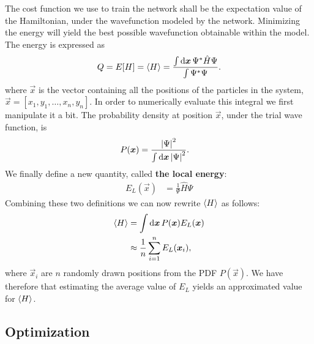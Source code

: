 \documentclass[a4paper, 11pt]{article}
\begin{document}
\begin{multicols}{2}
    The cost function we use to train the network shall be the expectation value
    of the Hamiltonian, under the wavefunction modeled by the network.
    Minimizing the energy will yield the best possible wavefunction obtainable
    within the model. The energy is expressed as
    \begin{align}
        Q = E[H] = \expval{H} = \frac{\int \dd{\bm x} \Psi^* \hat H \Psi}{\int
        \Psi^*\Psi}.
    \end{align}
    where $\vec x$ is the vector containing all the positions of the particles in
    the system, $\vec x = [x_1, y_1,\dots, x_n, y_n]$.
    In order to numerically evaluate this integral we first manipulate it a bit.
    The probability density at position $\vec x$, under the trial wave function, is
    \begin{align}
        P(\bm x) &= \frac{\abs{\Psi}^2}{\int \dd{\bm x}\abs{\Psi}^2}.
    \end{align}
    We finally define a new quantity, called \textbf{the local energy}:
    \begin{align}
        E_L(\vec x) &= \frac{1}{\Psi}\hat H\Psi\label{eq:E_L}
    \end{align}
    Combining these two definitions we can now rewrite $\expval{H}$ as follows:
    \begin{align}
        \begin{split}
            \expval{H} &= \int \dd{\bm x} P(\bm x) E_L(\bm x)\\
            &\approx
            \frac{1}{n}\sum_{i=1}^n E_L(\bm x_i),
        \end{split}\label{eq:the-objective}
    \end{align}
    where $\vec x_i$ are $n$ randomly drawn positions from the PDF $P(\vec x)$.
    We have therefore that estimating the average value of $E_L$ yields an
    approximated value for $\expval{H}$. 
    
    \subsection{Optimization}


\end{multicols}
\end{document}

